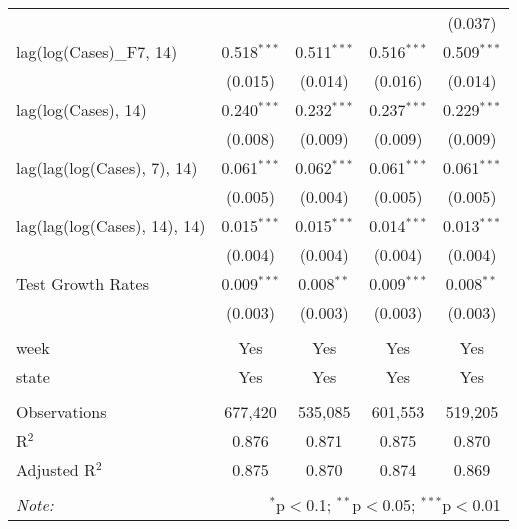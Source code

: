 \begin{tabular}{@{\extracolsep{1pt}}lcccc}
  &  &  &  & (0.037) \\ 
  lag(log(Cases)\_F7, 14) & 0.518$^{***}$ & 0.511$^{***}$ & 0.516$^{***}$ & 0.509$^{***}$ \\ 
  & (0.015) & (0.014) & (0.016) & (0.014) \\ 
  lag(log(Cases), 14) & 0.240$^{***}$ & 0.232$^{***}$ & 0.237$^{***}$ & 0.229$^{***}$ \\ 
  & (0.008) & (0.009) & (0.009) & (0.009) \\ 
  lag(lag(log(Cases), 7), 14) & 0.061$^{***}$ & 0.062$^{***}$ & 0.061$^{***}$ & 0.061$^{***}$ \\ 
  & (0.005) & (0.004) & (0.005) & (0.005) \\ 
  lag(lag(log(Cases), 14), 14) & 0.015$^{***}$ & 0.015$^{***}$ & 0.014$^{***}$ & 0.013$^{***}$ \\ 
  & (0.004) & (0.004) & (0.004) & (0.004) \\ 
  Test Growth Rates & 0.009$^{***}$ & 0.008$^{**}$ & 0.009$^{***}$ & 0.008$^{**}$ \\ 
  & (0.003) & (0.003) & (0.003) & (0.003) \\ 
 \hline \\[-1.8ex] 
week & Yes & Yes & Yes & Yes \\ 
state & Yes & Yes & Yes & Yes \\ 
\hline \\[-1.8ex] 
Observations & 677,420 & 535,085 & 601,553 & 519,205 \\ 
R$^{2}$ & 0.876 & 0.871 & 0.875 & 0.870 \\ 
Adjusted R$^{2}$ & 0.875 & 0.870 & 0.874 & 0.869 \\ 
\hline 
\hline \\[-1.8ex] 
\textit{Note:}  & \multicolumn{4}{r}{$^{*}$p$<$0.1; $^{**}$p$<$0.05; $^{***}$p$<$0.01} \\ 
\end{tabular} 